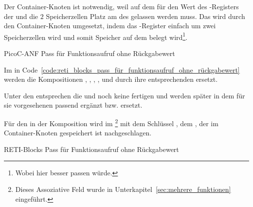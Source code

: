 Der Container-Knoten  ist notwendig, weil auf dem  für den Wert des -Registers der  und die  $2$ Speicherzellen Platz am  des  gelassen werden muss. Das wird durch den Container-Knoten  umgesetzt, indem das -Register einfach um zwei Speicherzellen  wird und somit Speicher auf dem  belegt wird\footnote{Wobei hier \dq {}\dq besser passen würde.}.

\begin{code}
  \centering
  \caption{PicoC-ANF Pass für Funktionsaufruf ohne Rückgabewert}
  \label{code:picoc_mon_pass_für_funktionsaufruf_ohne_rückgabewert}
\end{code}

Im  in Code~\ref{code:reti_blocks_pass_für_funktionsaufruf_ohne_rückgabewert} werden die Kompositionen , , , ,  und  durch ihre entsprechenden  ersetzt.

Unter den  entsprechen die   und  noch keine fertigen  und werden später in dem für sie vorgesehenen  passend ergänzt bzw. ersetzt.

Für den    in der Komposition  wird im  \footnote{Dieses Assoziative Feld wurde in Unterkapitel~\ref{sec:mehrere_funktionen} eingeführt.} mit dem Schlüssel , dem , der im Container-Knoten  gespeichert ist nachgeschlagen.

\begin{code}
  \centering
  \caption{RETI-Blocks Pass für Funktionsaufruf ohne Rückgabewert}
  \label{code:reti_blocks_pass_für_funktionsaufruf_ohne_rückgabewert}
\end{code}

